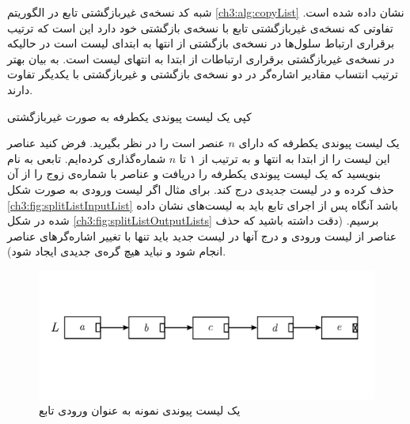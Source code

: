 
شبه کد نسخه‌ی غیربازگشتی تابع {} در الگوریتم {\eqref{ch3:alg:copyList}} نشان داده شده است. تفاوتی که نسخه‌ی غیربازگشتی تابع {} با نسخه‌ی بازگشتی خود دارد این است که ترتیب برقراری ارتباط سلول‌ها در نسخه‌ی بازگشتی از انتها به ابتدای لیست است در حالیکه در نسخه‌ی غیربازگشتی برقراری ارتباطات از ابتدا به انتهای لیست است. به بیان بهتر ترتیب انتساب مقادیر اشاره‌گر {} در دو نسخه‌ی بازگشتی و غیربازگشتی با یکدیگر تفاوت دارند.

\begin{algorithm}
\caption{کپی یک لیست پیوندی یکطرفه به صورت غیربازگشتی}\label{ch3:alg:copyList}
\begin{latin}
\end{latin}
\end{algorithm}

 یک لیست پیوندی یکطرفه‌ که دارای {$n$} عنصر است را در نظر بگیرید. فرض کنید عناصر این لیست را از ابتدا به انتها و به ترتیب از ۱ تا {$n$} شماره‌گذاری کرده‌ایم. تابعی به نام {} بنویسید که یک لیست پیوندی یکطرفه را دریافت و عناصر با شماره‌ی زوج را از آن حذف کرده و در لیست جدیدی درج کند. برای مثال اگر لیست ورودی به صورت شکل {\eqref{ch3:fig:splitListInputList}} باشد آنگاه پس از اجرای تابع باید به لیست‌های نشان داده شده در شکل {\eqref{ch3:fig:splitListOutputLists}} برسیم. (دقت داشته باشید که حذف عناصر از لیست ورودی و درج آنها در لیست جدید باید تنها با تغییر اشاره‌گرهای عناصر انجام شود و نباید هیچ گره‌‌ی جدیدی ایجاد شود).

\begin{figure}
\begin{center}
\includegraphics[scale=0.33]{figs/ch3/split_list_input_list.pdf}
\caption{یک لیست پیوندی نمونه به عنوان ورودی تابع {}}\label{ch3:fig:splitListInputList}
\end{center}
\end{figure}

